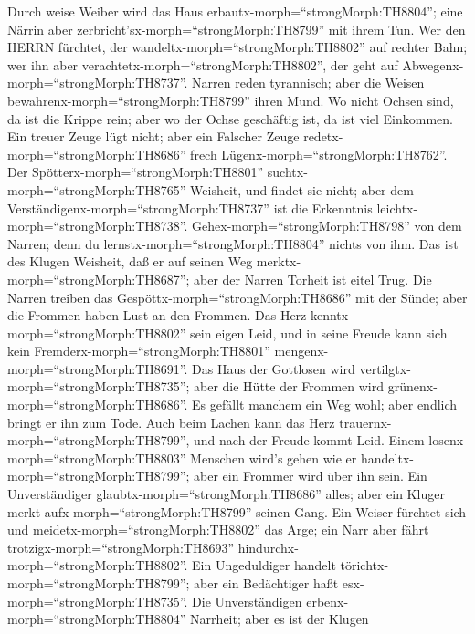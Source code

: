  Durch weise Weiber wird das Haus
erbautx-morph=``strongMorph:TH8804''; eine Närrin aber
zerbricht'sx-morph=``strongMorph:TH8799'' mit ihrem Tun. 
Wer den HERRN fürchtet, der wandeltx-morph=``strongMorph:TH8802'' auf
rechter Bahn; wer ihn aber verachtetx-morph=``strongMorph:TH8802'', der
geht auf Abwegenx-morph=``strongMorph:TH8737''.  Narren
reden tyrannisch; aber die Weisen bewahrenx-morph=``strongMorph:TH8799''
ihren Mund.  Wo nicht Ochsen sind, da ist die Krippe rein;
aber wo der Ochse geschäftig ist, da ist viel Einkommen. 
Ein treuer Zeuge lügt nicht; aber ein Falscher Zeuge
redetx-morph=``strongMorph:TH8686'' frech
Lügenx-morph=``strongMorph:TH8762''.  Der
Spötterx-morph=``strongMorph:TH8801''
suchtx-morph=``strongMorph:TH8765'' Weisheit, und findet sie nicht; aber
dem Verständigenx-morph=``strongMorph:TH8737'' ist die Erkenntnis
leichtx-morph=``strongMorph:TH8738''. 
Gehex-morph=``strongMorph:TH8798'' von dem Narren; denn du
lernstx-morph=``strongMorph:TH8804'' nichts von ihm.  Das
ist des Klugen Weisheit, daß er auf seinen Weg
merktx-morph=``strongMorph:TH8687''; aber der Narren Torheit ist eitel
Trug.  Die Narren treiben das
Gespöttx-morph=``strongMorph:TH8686'' mit der Sünde; aber die Frommen
haben Lust an den Frommen.  Das Herz
kenntx-morph=``strongMorph:TH8802'' sein eigen Leid, und in seine Freude
kann sich kein Fremderx-morph=``strongMorph:TH8801''
mengenx-morph=``strongMorph:TH8691''.  Das Haus der
Gottlosen wird vertilgtx-morph=``strongMorph:TH8735''; aber die Hütte
der Frommen wird grünenx-morph=``strongMorph:TH8686''.  Es
gefällt manchem ein Weg wohl; aber endlich bringt er ihn zum Tode.
 Auch beim Lachen kann das Herz
trauernx-morph=``strongMorph:TH8799'', und nach der Freude kommt Leid.
 Einem losenx-morph=``strongMorph:TH8803'' Menschen wird's
gehen wie er handeltx-morph=``strongMorph:TH8799''; aber ein Frommer
wird über ihn sein.  Ein Unverständiger
glaubtx-morph=``strongMorph:TH8686'' alles; aber ein Kluger merkt
aufx-morph=``strongMorph:TH8799'' seinen Gang.  Ein Weiser
fürchtet sich und meidetx-morph=``strongMorph:TH8802'' das Arge; ein
Narr aber fährt trotzigx-morph=``strongMorph:TH8693''
hindurchx-morph=``strongMorph:TH8802''.  Ein Ungeduldiger
handelt törichtx-morph=``strongMorph:TH8799''; aber ein Bedächtiger haßt
esx-morph=``strongMorph:TH8735''.  Die Unverständigen
erbenx-morph=``strongMorph:TH8804'' Narrheit; aber es ist der Klugen
